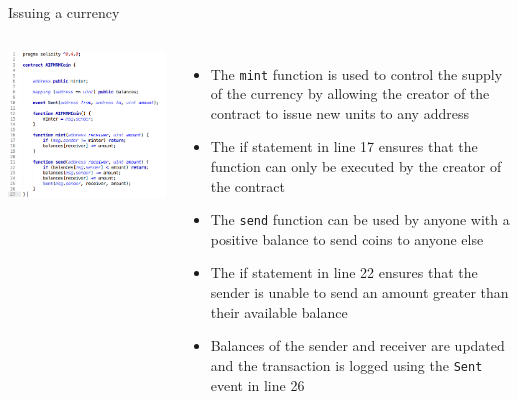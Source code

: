 \documentclass[9pt]{beamer}
\begin{document}
\begin{frame}{Issuing a currency}
	\begin{columns}
	    \includegraphics  [scale=0.3]{Images/contract5}

	    \begin{itemize}
			\item The \texttt{mint} function is used to control the supply of the currency by allowing the creator of the contract to issue new units to any address
			\item The if statement in line 17 ensures that the function can only be executed by the creator of the contract
			\item The \texttt{send} function can be used by anyone with a positive balance to send coins to anyone else
			\item The if statement in line 22 ensures that the sender is unable to send an amount greater than their available balance
			\item Balances of the sender and receiver are updated and the transaction is logged using the \texttt{Sent} event in line 26
	    \end{itemize}
	\end{columns}
\end{frame}

\end{document}
